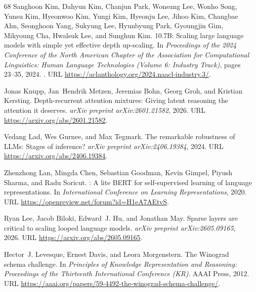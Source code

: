 \documentclass[]{bytedance_seed}
\theoremstyle{definition}
\theoremstyle{remark}
\begin{document}
\begin{thebibliography}{68}
Sanghoon Kim, Dahyun Kim, Chanjun Park, Wonsung Lee, Wonho Song, Yunsu Kim,
  Hyeonwoo Kim, Yungi Kim, Hyeonju Lee, Jihoo Kim, Changbae Ahn, Seonghoon
  Yang, Sukyung Lee, Hyunbyung Park, Gyoungjin Gim, Mikyoung Cha, Hwalsuk Lee,
  and Sunghun Kim.
 10.7{B}: Scaling large language models with simple yet
  effective depth up-scaling.
\newblock In \emph{Proceedings of the 2024 Conference of the North American
  Chapter of the Association for Computational Linguistics: Human Language
  Technologies (Volume 6: Industry Track)}, pages 23--35, 2024.
\newblock {}.
\newblock URL \url{https://aclanthology.org/2024.naacl-industry.3/}.

Jonas Knupp, Jan~Hendrik Metzen, Jeremias Bohn, Georg Groh, and Kristian
  Kersting.
\newblock Depth-recurrent attention mixtures: Giving latent reasoning the
  attention it deserves.
\newblock \emph{arXiv preprint arXiv:2601.21582}, 2026.
\newblock URL \url{https://arxiv.org/abs/2601.21582}.

Vedang Lad, Wes Gurnee, and Max Tegmark.
\newblock The remarkable robustness of {LLM}s: Stages of inference?
\newblock \emph{arXiv preprint arXiv:2406.19384}, 2024.
\newblock URL \url{https://arxiv.org/abs/2406.19384}.

Zhenzhong Lan, Mingda Chen, Sebastian Goodman, Kevin Gimpel, Piyush Sharma, and
  Radu Soricut.
: A lite {BERT} for self-supervised learning of language
  representations.
\newblock In \emph{International Conference on Learning Representations}, 2020.
\newblock URL \url{https://openreview.net/forum?id=H1eA7AEtvS}.

Ryan Lee, Jacob Biloki, Edward~J. Hu, and Jonathan May.
\newblock Sparse layers are critical to scaling looped language models.
\newblock \emph{arXiv preprint arXiv:2605.09165}, 2026.
\newblock URL \url{https://arxiv.org/abs/2605.09165}.

Hector~J. Levesque, Ernest Davis, and Leora Morgenstern.
\newblock The {W}inograd schema challenge.
\newblock In \emph{Principles of Knowledge Representation and Reasoning:
  Proceedings of the Thirteenth International Conference (KR)}. {AAAI} Press,
  2012.
\newblock URL
  \url{https://aaai.org/papers/59-4492-the-winograd-schema-challenge/}.


\end{thebibliography}
\end{document}
